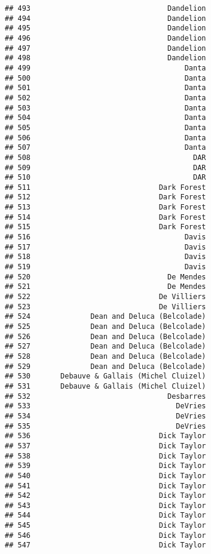 \documentclass[
]{article}
\begin{document}
\begin{verbatim}
## 493                                Dandelion
## 494                                Dandelion
## 495                                Dandelion
## 496                                Dandelion
## 497                                Dandelion
## 498                                Dandelion
## 499                                    Danta
## 500                                    Danta
## 501                                    Danta
## 502                                    Danta
## 503                                    Danta
## 504                                    Danta
## 505                                    Danta
## 506                                    Danta
## 507                                    Danta
## 508                                      DAR
## 509                                      DAR
## 510                                      DAR
## 511                              Dark Forest
## 512                              Dark Forest
## 513                              Dark Forest
## 514                              Dark Forest
## 515                              Dark Forest
## 516                                    Davis
## 517                                    Davis
## 518                                    Davis
## 519                                    Davis
## 520                                De Mendes
## 521                                De Mendes
## 522                              De Villiers
## 523                              De Villiers
## 524              Dean and Deluca (Belcolade)
## 525              Dean and Deluca (Belcolade)
## 526              Dean and Deluca (Belcolade)
## 527              Dean and Deluca (Belcolade)
## 528              Dean and Deluca (Belcolade)
## 529              Dean and Deluca (Belcolade)
## 530       Debauve & Gallais (Michel Cluizel)
## 531       Debauve & Gallais (Michel Cluizel)
## 532                                Desbarres
## 533                                  DeVries
## 534                                  DeVries
## 535                                  DeVries
## 536                              Dick Taylor
## 537                              Dick Taylor
## 538                              Dick Taylor
## 539                              Dick Taylor
## 540                              Dick Taylor
## 541                              Dick Taylor
## 542                              Dick Taylor
## 543                              Dick Taylor
## 544                              Dick Taylor
## 545                              Dick Taylor
## 546                              Dick Taylor
## 547                              Dick Taylor

\end{verbatim}
\end{document}
